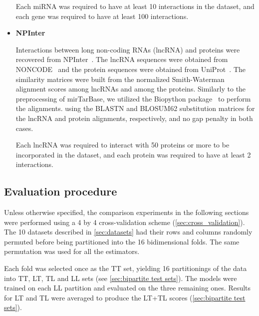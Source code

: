 \begin{itemize}
    Each miRNA was required to have at least 10 interactions in the dataset, and each gene was required to have at least 100 interactions.


    \item \textbf{NPInter~\cite{wu2006npinter, teng2020npinter}}

    Interactions between long non-coding RNAs (lncRNA) and proteins were recovered from NPInter~\cite{wu2006npinter, teng2020npinter}. The lncRNA sequences were obtained from NONCODE~\cite{liu2005noncode,zhao2016noncode} and the protein sequences were obtained from UniProt~\cite{consortium2019uniprot}. The similarity matrices were built from the normalized Smith-Waterman~\cite{yamanishi2008prediction} alignment scores among lncRNAs and among the proteins. Similarly to the preprocessing of mirTarBase, we utilized the Biopython package~\cite{cock2009biopython} to perform the alignments. using the BLASTN and BLOSUM62 substitution matrices for the lncRNA and protein alignments, respectively, and no gap penalty in both cases.

    Each lncRNA was required to interact with 50 proteins or more to be incorporated in the dataset, and each protein was required to have at least 2 interactions.

\end{itemize}


\subsection{Evaluation procedure}

Unless otherwise specified, the comparison experiments in the following sections were performed using a 4 by 4 cross-validation scheme (\autoref{sec:cross_validation}).
The 10 datasets described in \autoref{sec:datasets} had their rows and columns randomly permuted before being partitioned into the 16 bidimensional folds. The same permutation was used for all the estimators.

Each fold was selected once as the TT set, yielding 16 partitionings of the data into TT, LT, TL and LL sets (see \autoref{sec:bipartite test sets}). The models were trained on each LL partition and evaluated on the three remaining ones. Results for LT and TL were averaged to produce the LT+TL scores (\autoref{sec:bipartite test sets}).

